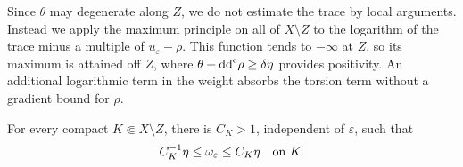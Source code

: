 Since $\theta$ may degenerate along $Z$, we do not estimate the trace by local arguments. Instead we apply the maximum principle on all of $X\setminus Z$ to the logarithm of the trace minus a multiple of $u_\varepsilon-\rho$. This function tends to $-\infty$ at $Z$, so its maximum is attained off $Z$, where $\theta+\mathrm{dd}^{\mathrm{c}}\rho\geq\delta\eta$ provides positivity. An additional logarithmic term in the weight absorbs the torsion term without a gradient bound for $\rho$.

\begin{lemma}\label{lem:degeneration-barrier-trace}
For every compact $K\Subset X\setminus Z$, there is $C_K>1$, independent of $\varepsilon$, such that
\[
 C_K^{-1}\eta\leq\omega_\varepsilon\leq C_K\eta
 \quad\hbox{on }K.
\]
\end{lemma}

